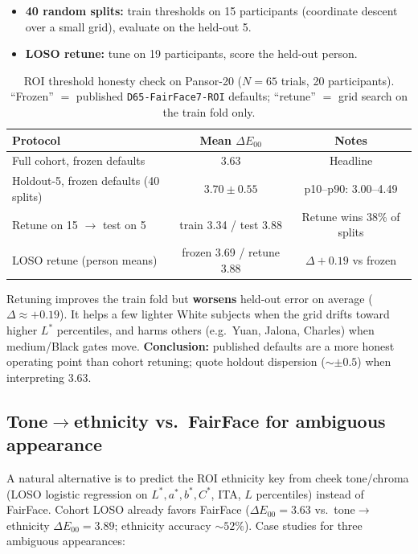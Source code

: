 \documentclass[11pt]{article}
\newcommand{\deee}{\ensuremath{\Delta E_{00}}}
\newcommand{\pipename}{\texttt{D65-FairFace7-ROI}}
\begin{document}
\begin{itemize}[leftmargin=*]
  \item \textbf{40 random splits:} train thresholds on 15 participants (coordinate descent over a small grid), evaluate on the held-out 5.
  \item \textbf{LOSO retune:} tune on 19 participants, score the held-out person.
\end{itemize}

\begin{table}[h]
\centering
\caption{ROI threshold honesty check on Pansor-20 ($N=65$ trials, 20 participants).
``Frozen'' $=$ published \pipename{} defaults; ``retune'' $=$ grid search on the train fold only.}
\label{tab:honesty}
\begin{tabular}{lcc}
\toprule
Protocol & Mean $\deee$ & Notes \\
\midrule
Full cohort, frozen defaults & 3.63 & Headline \\
Holdout-5, frozen defaults (40 splits) & $3.70\pm0.55$ & p10--p90: 3.00--4.49 \\
Retune on 15 $\to$ test on 5 & train 3.34 / test 3.88 & Retune wins 38\% of splits \\
LOSO retune (person means) & frozen 3.69 / retune 3.88 & $\Delta{+}0.19$ vs frozen \\
\bottomrule
\end{tabular}
\end{table}

Retuning improves the train fold but \textbf{worsens} held-out error on average ($\Delta\approx{+}0.19$).
It helps a few lighter White subjects when the grid drifts toward higher $L^*$ percentiles, and harms others (e.g.\ Yuan, Jalona, Charles) when medium/Black gates move.
\textbf{Conclusion:} published defaults are a more honest operating point than cohort retuning; quote holdout dispersion (${\sim}\pm0.5$) when interpreting 3.63.

\subsection{Tone$\to$ethnicity vs.\ FairFace for ambiguous appearance}
\label{sec:tone-vs-ff}
A natural alternative is to predict the ROI ethnicity key from cheek tone/chroma (LOSO logistic regression on $L^*,a^*,b^*,C^*$, ITA, $L$ percentiles) instead of FairFace.
Cohort LOSO already favors FairFace ($\deee=\num{3.63}$ vs.\ tone$\to$ethnicity $\deee=\num{3.89}$; ethnicity accuracy ${\sim}52\%$).
Case studies for three ambiguous appearances:
\end{document}
